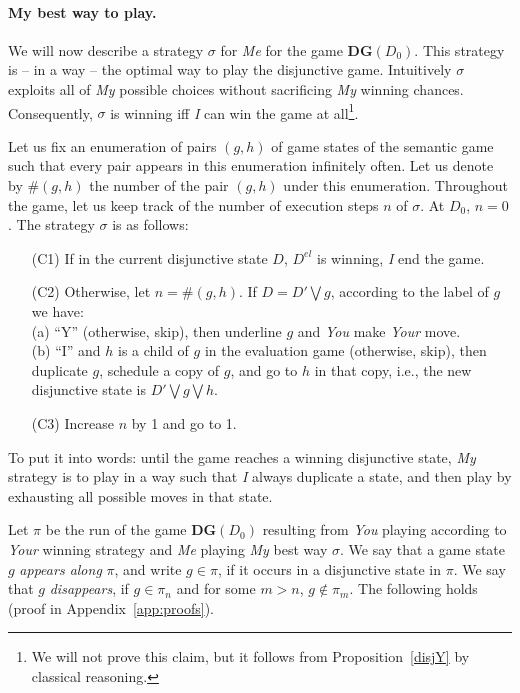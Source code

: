 \documentclass{easychair}
\newcommand{\I}{\emph{I}\xspace}
\newcommand{\You}{\emph{You}\xspace}
\newcommand{\My}{\emph{My}\xspace}
\newcommand{\Me}{\emph{Me}\xspace}
\newcommand{\Your}{\emph{Your}\xspace}
\begin{document}
\paragraph{My best way to play.}
We will now describe a strategy $\sigma$ for \Me for the game
$\mathbf{DG}(D_0)$. This strategy is -- in a way -- the optimal way to play the
disjunctive game. Intuitively $\sigma$ exploits all of \My possible choices
without sacrificing \My winning chances. Consequently, $\sigma$ is winning iff
\I can win the game at all\footnote{We will not prove this claim, but it
follows from Proposition~\ref{disjY} by classical reasoning.}.

Let us fix an enumeration of pairs $(g,h)$ of game states of the semantic game such that every pair appears in this enumeration infinitely often. Let us denote by $\#(g,h)$ the number of the pair $(g,h)$ under this enumeration. Throughout the game, let us keep track of the number of execution steps $n$ of $\sigma$. At $D_0$, $n=0$. The strategy $\sigma$ is as follows:

\begin{enumerate}
    \item[(C1)] If in the current disjunctive state $D$, $D^{el}$ is winning, \I end the game.
    \item[(C2)] Otherwise, let $n=\#(g,h)$. If $D=D'\bigvee g$, according to the label of  $g$ we have: 
    \\
    \noindent(a)  ``Y'' (otherwise, skip), then underline $g$ and \You make \Your move. \\
    \noindent (b)  ``I'' and $h$ is a child of $g$ in the evaluation game (otherwise, skip), then duplicate $g$, schedule a copy of $g$, and go to $h$ in that copy, i.e., the new disjunctive state is $D'\bigvee g \bigvee h$.
\item[(C3)] Increase $n$ by 1 and go to 1.
\end{enumerate}

To put it into words: until the game reaches a winning disjunctive state, \My
strategy is to play in a way such that \I always duplicate a state, and then play
by exhausting all possible moves in that state. 

Let $\pi$ be the run of the game
$\mathbf{DG}(D_0)$ resulting from \You playing according to \Your winning
strategy and \Me playing \My best way $\sigma$. We say that a game state $g$
\emph{appears along} $\pi$, and write $g\in \pi$, if it occurs in a disjunctive
state in $\pi$. We say that $g$ \emph{disappears}, if $g\in \pi_n$ and for some
$m> n$, $g\notin \pi_m$. The following holds (proof in Appendix~\ref{app:proofs}).
\end{document}
